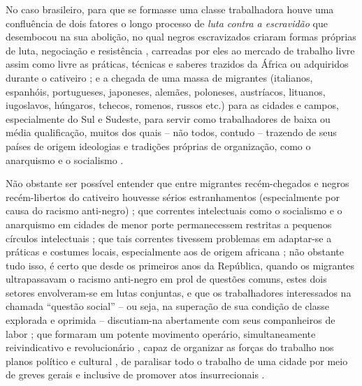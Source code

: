 No caso brasileiro, para que se formasse uma classe trabalhadora houve uma confluência de dois fatores \cite[p.~27]{chalhoub_botequim_1986} o longo processo de \textit{luta contra a escravidão} que desembocou na sua abolição, no qual negros escravizados criaram formas próprias de luta, negociação e resistência \cite{AZEVEDO2004, bethell_trafico_2002, chalhoub_liberdade_1990, conrad_ultimosanos_1978, farias_cidadesnegras_2006, fraga_encruzilhadas_2014, luna_lutaescravidao_1976, reis_elitemovsoc_1976, REISSILVA1989, REIS2004males, reis_familiareal_2008, schwartz_1814_1996, silva2007caminhos}, carreadas por eles ao mercado de trabalho livre assim como livre as práticas, técnicas e saberes trazidos da África ou adquiridos durante o cativeiro \cite{fraga_encruzilhadas_2014, souza_trabalholivre_2011, REIS2012}; e a chegada de uma massa de migrantes (italianos, espanhóis, portugueses, japoneses, alemães, poloneses, austríacos, lituanos, iugoslavos, húngaros, tchecos, romenos, russos etc.) para as cidades e campos, especialmente do Sul e Sudeste, para servir como trabalhadores de baixa ou média qualificação, muitos dos quais -- não todos, contudo -- trazendo de seus países de origem ideologias e tradições próprias de organização, como o anarquismo e o socialismo \cite{petrone_imigra_1977}.

Não obstante ser possível entender que entre migrantes recém-chegados e negros recém-libertos do cativeiro houvesse sérios estranhamentos (especialmente por causa do racismo anti-negro) \cite[pp.~35-76]{chalhoub_botequim_1986}; que correntes intelectuais como o socialismo e o anarquismo em cidades de menor porte permanecessem restritas a pequenos círculos intelectuais \cite{duarte_rebelde_1991}; que tais correntes tivessem problemas em adaptar-se a práticas e costumes locais, especialmente aos de origem africana \cite{goes_formacao_1988}; não obstante tudo isso, é certo que desde os primeiros anos da República, quando os migrantes ultrapassavam o racismo anti-negro em prol de questões comuns, estes dois setores envolveram-se em lutas conjuntas, e que os trabalhadores interessados na chamada ``questão social'' -- ou seja, na superação de sua condição de classe explorada e oprimida -- discutiam-na abertamente com seus companheiros de labor \cite[p.~73-85]{gomes_velhos_1988}; que formaram um potente movimento operário, simultaneamente reivindicativo e revolucionário \cite{samis_anabras_2004}, capaz de organizar as forças do trabalho nos planos político e cultural \cite{farinha_federa_2002,hardman_patripatr_2002}, de paralisar todo o trabalho de uma cidade por meio de greves gerais \cite{castellucci_salvador_2001,magnani_anarsp_1982} e inclusive de promover atos insurrecionais \cite{dulles_anacombras_1977,koval_prolbras_1982}.  

